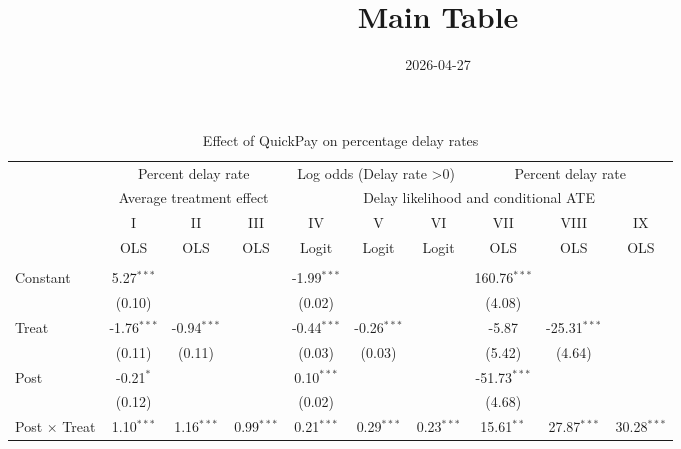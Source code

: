 \documentclass[
]{article}
\title{Main Table}
\author{}
\date{\vspace{-2.5em}2026-04-27}
\begin{document}
\maketitle

\begin{table}[htbp]
   \caption{Effect of QuickPay on percentage delay rates}
   \centering
   \small
   \begin{tabular}{lccccccccc}
      \toprule
      \midrule  & \multicolumn{3}{c}{Percent delay rate} & \multicolumn{3}{c}{Log odds (Delay rate >0)} & \multicolumn{3}{c}{Percent delay rate}\\
        & \multicolumn{3}{c}{Average treatment effect} & \multicolumn{6}{c}{Delay likelihood and conditional ATE} \\ 
      \midrule  & I & II & III & IV & V & VI & VII & VIII & IX\\
                              &  OLS          & OLS           & OLS           & Logit         & Logit         & Logit        & OLS            & OLS            & OLS\\  
      \midrule \\
      Constant                & 5.27$^{***}$  &               &               & -1.99$^{***}$ &               &              & 160.76$^{***}$ &                &   \\   
                              & (0.10)        &               &               & (0.02)        &               &              & (4.08)         &                &   \\   
      Treat                   & -1.76$^{***}$ & -0.94$^{***}$ &               & -0.44$^{***}$ & -0.26$^{***}$ &              & -5.87          & -25.31$^{***}$ &   \\   
                              & (0.11)        & (0.11)        &               & (0.03)        & (0.03)        &              & (5.42)         & (4.64)         &   \\   
      Post                    & -0.21$^{*}$   &               &               & 0.10$^{***}$  &               &              & -51.73$^{***}$ &                &   \\   
                              & (0.12)        &               &               & (0.02)        &               &              & (4.68)         &                &   \\   
      Post $\times$ Treat     & 1.10$^{***}$  & 1.16$^{***}$  & 0.99$^{***}$  & 0.21$^{***}$  & 0.29$^{***}$  & 0.23$^{***}$ & 15.61$^{**}$   & 27.87$^{***}$  & 30.28$^{***}$\\   

\end{tabular}
\end{table}
\end{document}
